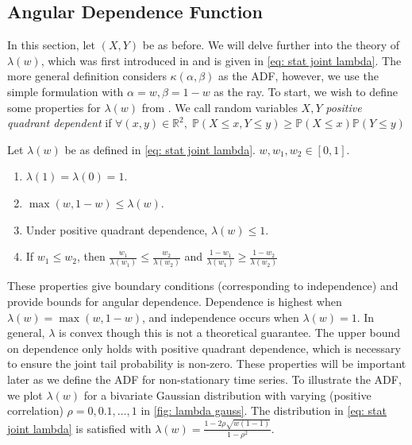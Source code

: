 \documentclass[12pt]{article}
\begin{document}
  \subsection{Angular Dependence Function}
  In this section, let $(X, Y)$ be as before. We will delve further into the theory of $\lambda(w)$, which was first introduced in \citep{TawnWadsworth2013} and is given in \cref{eq: stat joint lambda}. 
  The more general definition considers $\kappa(\alpha, \beta)$ as the ADF, however, we use the simple formulation with $\alpha = w, \beta = 1 - w$ as the ray.
  To start, we wish to define some properties for $\lambda(w)$ from \citep{TawnWadsworth2013}. We call random variables $X, Y$ \textit{positive quadrant dependent} if $\forall (x, y) \in \mathbb{R}^2, \; \mathbb{P}(X \leq x, Y \leq y) \geq \mathbb{P}(X \leq x)\mathbb{P}(Y \leq y)$
  \begin{proposition} \label{prop: lambda}
    Let $\lambda(w)$ be as defined in \cref{eq: stat joint lambda}. $w, w_1, w_2 \in [0, 1]$.
    \begin{enumerate}
      \item $\lambda(1) = \lambda(0) = 1$.
      \item $\max(w, 1 - w) \leq \lambda(w)$.
      \item Under positive quadrant dependence, $\lambda(w) \leq 1$.
      \item If $w_1 \leq w_2$, then $\frac{w_1}{\lambda(w_1)} \leq \frac{w_2}{\lambda(w_2)}$ and $\frac{1 - w_1}{\lambda(w_1)} \geq \frac{1 - w_2}{\lambda(w_2)}$
    \end{enumerate}
  \end{proposition}

  These properties give boundary conditions (corresponding to independence) and provide bounds for angular dependence.
  Dependence is highest when $\lambda(w) = \max(w, 1 - w)$, and independence occurs when $\lambda(w) = 1$. In general, $\lambda$ is convex though this is not a theoretical guarantee.
  The upper bound on dependence only holds with positive quadrant dependence, which is necessary to ensure the joint tail probability is non-zero.
  These properties will be important later as we define the ADF for non-stationary time series.
  To illustrate the ADF, we plot $\lambda(w)$ for a bivariate Gaussian distribution with varying (positive correlation) $\rho = 0, 0.1,\dots,1$ in \cref{fig: lambda gauss}. The distribution in \cref{eq: stat joint lambda} is satisfied with $\lambda(w) = \frac{1 - 2\rho\sqrt{w(1 - 1)}}{1 - \rho^2}$.
\end{document}
